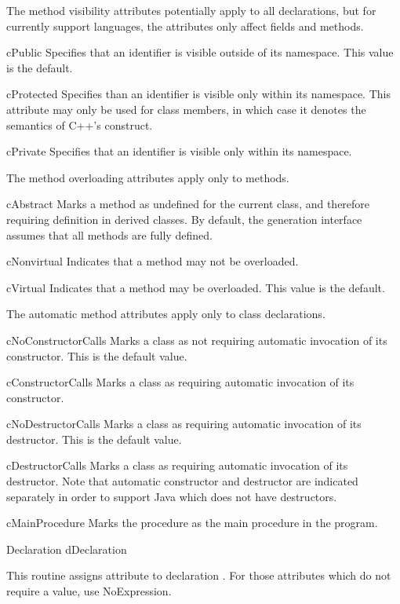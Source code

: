 \begin{Description}
\item [] 
The method visibility attributes potentially apply to all
declarations, but for currently support languages, the attributes only
affect fields and methods.
\item [cPublic] Specifies that an identifier is visible outside of its
namespace.  This value is the default.
\item [cProtected] Specifies than an identifier is visible only within
its namespace.  This attribute may only be used for class members, in
which case it denotes the semantics of C++'s  construct.
\item [cPrivate] Specifies that an identifier is visible only within
its namespace.

\item [] 
The method overloading attributes apply only to methods.
\item [cAbstract] Marks a method as undefined for the current class,
and therefore requiring definition in derived classes.  By default,
the generation interface assumes that all methods are fully defined.
\item [cNonvirtual] Indicates that a method may not be overloaded.
\item [cVirtual] Indicates that a method may be overloaded.  This value
is the default.

\item [] 
The automatic method attributes apply only to class declarations.
\item [cNoConstructorCalls] Marks a class as not requiring automatic
invocation of its constructor.  This is the default value.
\item [cConstructorCalls] Marks a class as requiring automatic
invocation of its constructor.
\item [cNoDestructorCalls] Marks a class as requiring automatic
invocation of its destructor.  This is the default value.
\item [cDestructorCalls] Marks a class as requiring automatic
invocation of its destructor.  Note that automatic constructor and destructor
are indicated separately in order to support Java which does not
have destructors.
\item [cMainProcedure] Marks the procedure as the main procedure in
the program.

\end{Description}

	{Declaration d}{Declaration}
\begin{functionality}
This routine assigns attribute  to declaration .
For those attributes which do not require a value, use NoExpression.  
\end{functionality}


